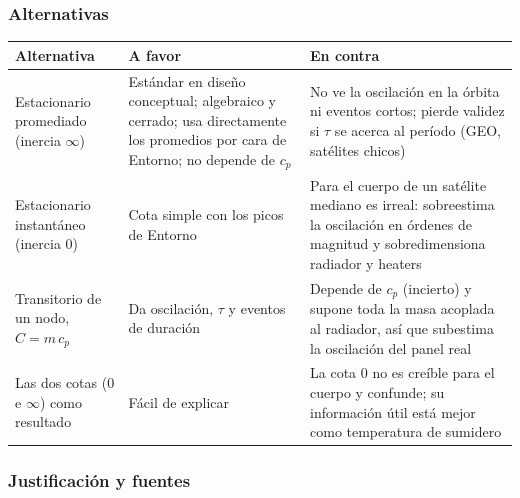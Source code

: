 \documentclass[11pt,a4paper]{article}
\begin{document}
\subsubsection*{Alternativas}

{\small
\begin{xltabular}{\textwidth}{@{}P{3.3cm}LL@{}}
\toprule
\textbf{Alternativa} & \textbf{A favor} & \textbf{En contra} \\
\midrule
\endhead
Estacionario promediado (inercia $\infty$) & Estándar en diseño conceptual; algebraico y cerrado; usa directamente los promedios por cara de Entorno; no depende de $c_p$ & No ve la oscilación en la órbita ni eventos cortos; pierde validez si $\tau$ se acerca al período (GEO, satélites chicos) \\
Estacionario instantáneo (inercia 0) & Cota simple con los picos de Entorno & Para el cuerpo de un satélite mediano es irreal: sobreestima la oscilación en órdenes de magnitud y sobredimensiona radiador y heaters \\
Transitorio de un nodo, $C = m\,c_p$ & Da oscilación, $\tau$ y eventos de duración & Depende de $c_p$ (incierto) y supone toda la masa acoplada al radiador, así que subestima la oscilación del panel real \\
Las dos cotas (0 e $\infty$) como resultado & Fácil de explicar & La cota 0 no es creíble para el cuerpo y confunde; su información útil está mejor como temperatura de sumidero \\
\bottomrule
\end{xltabular}
}

\subsubsection*{Justificación y fuentes}
\end{document}
